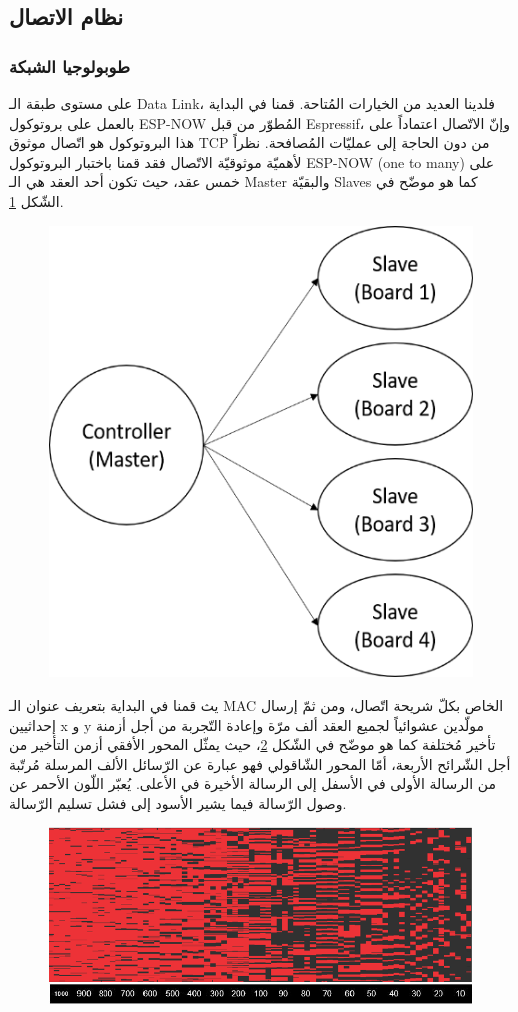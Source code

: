 \subsection{نظام الاتصال}
\subsubsection{طوبولوجيا الشبكة}
على مستوى طبقة الـ Data Link، فلدينا العديد من الخيارات المُتاحة. قمنا في البداية بالعمل على بروتوكول ESP-NOW المُطوّر من قبل Espressif، وإنّ الاتّصال اعتماداً على هذا البروتوكول هو اتّصال موثوق TCP من دون الحاجة إلى عمليّات المُصافحة.
نظراً لأهميّة موثوقيّة الاتّصال فقد قمنا باختبار البروتوكول ESP-NOW (one to many) على خمس عقد، حيث تكون أحد العقد هي الـ Master والبقيّة Slaves كما هو موضّح في الشّكل \ref{fig:fig161}.
\begin{figure}
	\centering
	\includegraphics[width=0.4\linewidth]{figs/16/fig16_1}
	\caption{}
	\label{fig:fig161}
\end{figure}


يث قمنا في البداية بتعريف عنوان الـ MAC الخاص بكلّ شريحة اتّصال، ومن ثمّ إرسال إحداثيين x و y مولّدين عشوائياً لجميع العقد ألف مرّة وإعادة التّجربة من أجل أزمنة تأخير مُختلفة كما هو موضّح في الشّكل \ref{fig:fig162}، حيث يمثّل المحور الأفقي أزمن التأخير من أجل الشّرائح  الأربعة، أمّا المحور الشّاقولي فهو عبارة عن الرّسائل الألف المرسلة مُرتّبة من الرسالة الأولى في الأسفل إلى الرسالة الأخيرة في الأعلى.  يُعبّر اللّون الأحمر عن وصول الرّسالة فيما يشير الأسود إلى فشل تسليم الرّسالة.

\begin{figure}
	\centering
	\includegraphics[width=0.9\linewidth]{figs/16/fig16_2}
	\caption{}
	\label{fig:fig162}
\end{figure}

